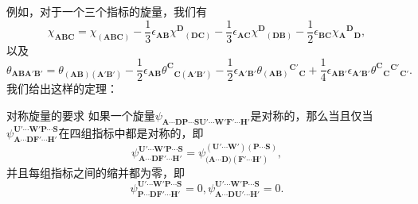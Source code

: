例如，对于一个三个指标的旋量，我们有
\begin{equation*}
	\chi _{\boldsymbol{ABC}} =\chi _{(\boldsymbol{ABC})} -\frac{1}{3} \epsilon _{\boldsymbol{AB}} \chi ^{\boldsymbol{D}}{}_{(\boldsymbol{DC})} -\frac{1}{3} \epsilon _{\boldsymbol{AC}} \chi ^{\boldsymbol{D}}{}_{(\boldsymbol{DB})} -\frac{1}{2} \epsilon _{\boldsymbol{BC}} \chi {_{\boldsymbol{A}}}^{\boldsymbol{D}}{}_{\boldsymbol{D}} ,
\end{equation*}
以及
\begin{equation*}
	\theta _{\boldsymbol{ABA} '\boldsymbol{B} '} =\theta _{(\boldsymbol{AB} )(\boldsymbol{A} '\boldsymbol{B} ')} -\frac{1}{2} \epsilon _{\boldsymbol{AB}} \theta ^{\boldsymbol{C}}{}_{\boldsymbol{C}(\boldsymbol{A} '\boldsymbol{B} ')} -\frac{1}{2} \epsilon _{\boldsymbol{A} '\boldsymbol{B} '} \theta {_{(\boldsymbol{AB} )}}\boldsymbol{^{\boldsymbol{C} '}{}}_{\boldsymbol{C}} +\frac{1}{4} \epsilon _{\boldsymbol{AB} '} \epsilon _{\boldsymbol{A} '\boldsymbol{B} '} \theta ^{\boldsymbol{C}}{}{_{\boldsymbol{C}}}^{\boldsymbol{C} '}{}_{\boldsymbol{C} '} .
\end{equation*}
我们给出这样的定理：

\begin{them}[label={requirement of a symmetric spinor}]{对称旋量的要求}
	如果一个旋量$\psi _{\boldsymbol{A} \cdots \boldsymbol{DP} \cdots \boldsymbol{SU} '\cdots \boldsymbol{W} '\boldsymbol{F} '\cdots \boldsymbol{H} '}$是对称的，那么当且仅当$\psi _{\boldsymbol{A} \cdots \boldsymbol{DF} '\cdots \boldsymbol{H} '}^{\boldsymbol{U} '\cdots \boldsymbol{W} '\boldsymbol{P} \cdots \boldsymbol{S}}$在四组指标中都是对称的，即
	\begin{equation*}
		\psi _{\boldsymbol{A} \cdots \boldsymbol{DF} '\cdots \boldsymbol{H} '}^{\boldsymbol{U} '\cdots \boldsymbol{W} '\boldsymbol{P} \cdots \boldsymbol{S}} =\psi _{(\boldsymbol{A \cdots D)}(\boldsymbol{F} '\cdots \boldsymbol{H} ')}^{(\boldsymbol{U} '\cdots \boldsymbol{W} ')(\boldsymbol{P} \cdots \boldsymbol{S})} ,
	\end{equation*}
	并且每组指标之间的缩并都为零，即
	\begin{equation*}
		\psi _{\boldsymbol{P} \cdots \boldsymbol{DF} '\cdots \boldsymbol{H} '}^{\boldsymbol{U} '\cdots \boldsymbol{W} '\boldsymbol{P} \cdots \boldsymbol{S}} =0,\psi _{\boldsymbol{A} \cdots \boldsymbol{DU} '\cdots \boldsymbol{H} '}^{\boldsymbol{U} '\cdots \boldsymbol{W} '\boldsymbol{P} \cdots \boldsymbol{S}} =0.
	\end{equation*}
\end{them}


